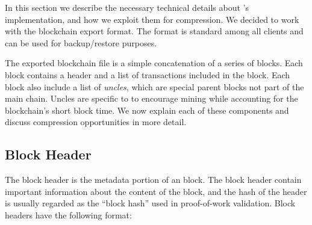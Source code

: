 In this section we describe the necessary technical details about \eth{}'s implementation, and how we exploit them for compression.
We decided to work with the \eth{} blockchain export format.
The format is standard among all \eth{} clients and can be used for backup/restore purposes.

The exported blockchain file is a simple concatenation of a series of blocks.
Each block contains a header and a list of transactions included in the block.
Each \eth{} block also include a list of {\em uncles}, which are special parent blocks not part of the main chain.
Uncles are specific to \eth{} to encourage mining while accounting for the blockchain's short block time.
We now explain each of these components and discuss compression opportunities in more detail.


\subsection{Block Header}
The block header is the metadata portion of an \eth{} block. The block header contain important
information about the content of the block, and the hash of the header is usually regarded as the ``block hash''
used in proof-of-work validation.
Block headers have the following format:

